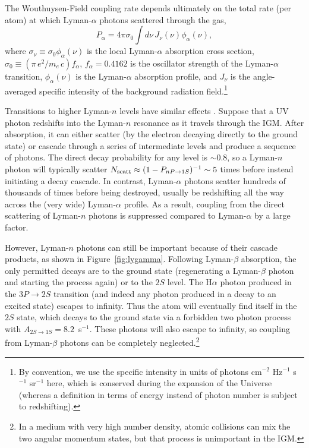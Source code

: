 \documentclass[a4paper,openany, 12pt]{book}
\begin{document}
The Wouthuysen-Field coupling rate depends ultimately on the total rate (per atom) at which Lyman-$\alpha$ photons scattered through the gas,
\begin{equation}
P_\alpha = 4 \pi \sigma_0 \int d \nu \, J_\nu(\nu) \phi_\alpha(\nu),
\label{eq:palpha}
\end{equation}
where $\sigma_\nu \equiv \sigma_0 \phi_\alpha(\nu)$ is the local Lyman-$\alpha$ absorption cross section, $\sigma_0 \equiv (\pi \, e^2/m_e \, c) f_{\alpha}$, $f_\alpha=0.4162$ is the oscillator strength of the Lyman-$\alpha$ transition, $\phi_\alpha(\nu)$ is the Lyman-$\alpha$ absorption profile, and $J_\nu$ is the angle-averaged specific intensity of the background radiation field.\footnote{By convention, we use the specific intensity in units of photons cm$^{-2}$ Hz$^{-1}$ s$^{-1}$ sr$^{-1}$ here, which is conserved during the expansion of the Universe (whereas a definition in terms of energy instead of photon number is subject to redshifting).}   

Transitions to higher Lyman-$n$ levels have similar effects \cite{hirata06, pritchard06}. Suppose that a UV photon redshifts into the Lyman-$n$ resonance as it travels through the IGM.  After absorption, it can either scatter (by the electron decaying directly to the ground state) or cascade through a series of intermediate levels and produce a sequence of photons.  The direct decay probability for any level is $\sim 0.8$, so a Lyman-$n$ photon will typically scatter $N_{\rm scatt} \approx (1-P_{nP\rightarrow1S})^{-1} \sim 5$ times before instead initiating a decay cascade.  In contrast, Lyman-$\alpha$ photons scatter hundreds of thousands of times before being destroyed, usually be redshifting all the way across the (very wide) Lyman-$\alpha$ profile.  As a result, coupling from the direct scattering of Lyman-$n$ photons is suppressed compared to Lyman-$\alpha$ by a large factor.

However, Lyman-$n$ photons can still be important because of their cascade products, as shown in Figure~\ref{fig:lygamma}.  Following Lyman-$\beta$ absorption, the only permitted decays are to the ground state (regenerating a Lyman-$\beta$ photon and starting the process again) or to the $2S$ level.  The H$\alpha$ photon produced in the $3P \rightarrow 2S$ transition (and indeed any photon produced in a decay to an excited state) escapes to infinity. Thus the atom will eventually find itself in the $2S$ state, which decays to the ground state via a forbidden two photon process with $A_{2S\rightarrow1S}=8.2$~s$^{-1}$.  These photons will also escape to infinity, so coupling from Lyman-$\beta$ photons can be completely neglected.\footnote{In a medium with very high number density, atomic collisions can mix the two angular momentum states, but that process is unimportant in the IGM.}
\end{document}
